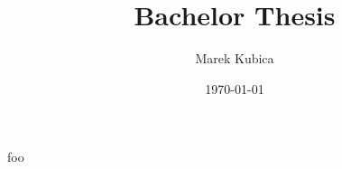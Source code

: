 \documentclass{scrartcl}
\author{Marek Kubica}
\title{Bachelor Thesis}
\date{\today}
\begin{document}
\maketitle
foo
\end{document}
